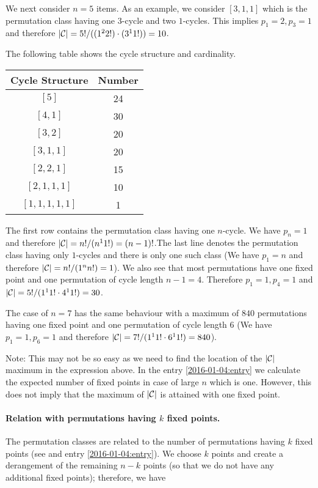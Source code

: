 We next consider $n=5$ items. As an example, we consider $[3,1,1]$ which is the permutation class having one $3$-cycle and two $1$-cycles. This implies $p_1=2, p_3=1$ and therefore $|\mathcal{C}| = 5! / ((1^2 2!) \cdot (3^1 1!)) = 10$. 

The following table shows the cycle structure and cardinality.

\vspace{2mm}

\begin{tabular}{cc}
    Cycle Structure & Number \\ \hline
    $[5]$ &  24 \\
    $[4, 1]$ & 30 \\
    $[3, 2]$ & 20 \\
    $[3, 1, 1]$ & 20 \\
    $[2, 2, 1]$ & 15 \\
    $[2, 1, 1, 1]$ & 10 \\
    $[1, 1, 1, 1, 1]$ & 1
\end{tabular}

\vspace{2mm}

The first row contains the permutation class having one $n$-cycle. We have $p_n=1$ and therefore $|\mathcal{C}| = n!/(n^1 1!) = (n-1)!$.The last line denotes the permutation class having only $1$-cycles and there is only one such class (We have $p_1=n$ and therefore $|\mathcal{C}| = n!/(1^n n!) = 1$). We also see that most permutations have one fixed point and one permutation of cycle length $n-1=4$. Therefore $p_1=1, p_{4}=1$ and $|\mathcal{C}| = 5!/(1^1 1! \cdot 4^1 1! ) = 30$.

The case of $n=7$ has the same behaviour with a maximum of $840$ permutations having one fixed point and one permutation of cycle length $6$ (We have $p_1=1, p_6=1$ and therefore $|\mathcal{C}| = 7!/(1^1 1! \cdot 6^1 1!) = 840$).

Note: This may not be so easy as we need to find the location of the $|\mathcal{C}|$ maximum in the expression above. In the entry \ref{2016-01-04:entry} we calculate the expected number of fixed points in case of large $n$ which is one. However, this does not imply that the maximum of $|\mathcal{C}|$ is attained with one fixed point.


\paragraph{Relation with permutations having $k$ fixed points.} The permutation classes are related to the number of permutations having $k$ fixed points (see \cite{Baez2019} and entry \ref{2016-01-04:entry}). We choose $k$ points and create a derangement of the remaining $n-k$ points (so that we do not have any additional fixed points); therefore, we have

